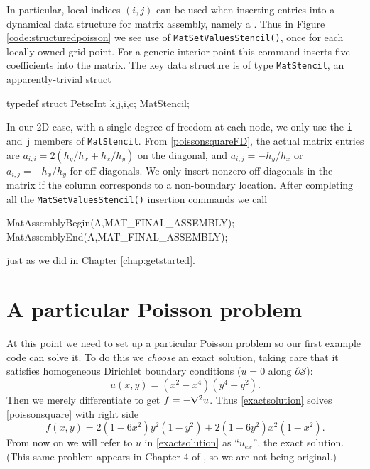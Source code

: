 In particular, local indices $(i,j)$ can be used when inserting entries into a dynamical data structure for matrix assembly, namely a \pMat.  Thus in Figure \ref{code:structuredpoisson} we see use of \texttt{MatSetValuesStencil()}, once for each locally-owned grid point.  For a generic interior point this command inserts five coefficients into the matrix.  The key data structure is of type \texttt{MatStencil}, an apparently-trivial struct
\begin{code}
typedef struct {
  PetscInt k,j,i,c;
} MatStencil;
\end{code}
In our 2D case, with a single degree of freedom at each node, we only use the \texttt{i} and \texttt{j} members of \texttt{MatStencil}.  From \eqref{poissonsquareFD}, the actual matrix entries are $a_{i,i} = 2\left(h_y/h_x + h_x/h_y\right)$ on the diagonal, and $a_{i,j} = -h_y/h_x$ or $a_{i,j} = -h_x/h_y$ for off-diagonals.  We only insert nonzero off-diagonals in the matrix if the column corresponds to a non-boundary location.  After completing all the \texttt{MatSetValuesStencil()} insertion commands we call 
\begin{code}
MatAssemblyBegin(A,MAT_FINAL_ASSEMBLY);
MatAssemblyEnd(A,MAT_FINAL_ASSEMBLY);
\end{code}
just as we did in Chapter \ref{chap:getstarted}.


\section{A particular Poisson problem}

At this point we need to set up a particular Poisson problem so our first example code can solve it.  To do this we \emph{choose} an exact solution, taking care that it satisfies homogeneous Dirichlet boundary conditions ($u=0$ along $\partial \mathcal{S}$):
\begin{equation}
u(x,y) = (x^2 - x^4) (y^4 - y^2). \label{exactsolution}
\end{equation}
Then we merely differentiate to get $f = -\nabla^2 u$.  Thus \eqref{exactsolution} solves \eqref{poissonsquare} with right side
\begin{equation}
f(x,y) = 2 (1 - 6 x^2) y^2 (1 - y^2) + 2 (1 - 6 y^2) x^2 (1 - x^2).\label{manufacturedf}
\end{equation}
From now on we will refer to $u$ in \eqref{exactsolution} as ``$u_{ex}$'', the exact solution.  (This same problem appears in Chapter 4 of \citep{Briggsetal2000}, so we are not being original.) %

